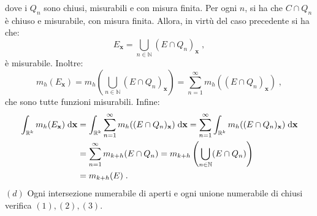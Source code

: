 \documentclass[a4paper,12pt]{report}
\theoremstyle{plain}
\theoremstyle{definition}
\theoremstyle{remark}
\newcommand{\diff}[1]{\mathrm{d}#1}
\numberwithin{equation}{section}
\begin{document}
dove i $Q_n$ sono chiusi, misurabili e con misura finita. Per ogni $n$, si ha che $C\cap Q_n$ è chiuso e misurabile, con misura finita. 
Allora, in virtù del caso precedente si ha che:
\begin{equation}
E_{\mathbf{x}}=\bigcup_{n\in\mathbb{N}}(E\cap Q_n)_{\mathbf{x}}\;,
\end{equation}
è misurabile. Inoltre:
\begin{equation}
m_h(E_{\mathbf{x}})=m_h\left(\bigcup_{n\in\mathbb{N}}(E\cap Q_n)_{\mathbf{x}}\right)=\sum_{n=1}^{\infty}m_h((E\cap Q_n)_{\mathbf{x}})\;,
\end{equation}
che sono tutte funzioni misurabili. Infine:
\begin{align}
\int_{\mathbb{R}^k}m_h(E_{\mathbf{x}})\;\diff{\mathbf{x}} &=\int_{\mathbb{R}^k}\sum_{n=1}^{\infty} m_h((E\cap Q_n)_{\mathbf{x}})\;\diff{\mathbf{x}}=\sum_{n=1}^{\infty}\int_{\mathbb{R}^k} m_h((E\cap Q_n)_{\mathbf{x}})\;\diff{\mathbf{x}}\notag \\
&=\sum_{n=1}^{\infty}m_{k+h}(E\cap Q_n)=m_{k+h}\left(\bigcup_{n\in\mathbb{N}}(E\cap Q_n)\right) \notag \\
&=m_{k+h}(E)\;.
\end{align}
$(d)$ Ogni intersezione numerabile di aperti e ogni unione numerabile di chiusi verifica $(1),(2),(3)$. \\
\end{document}
